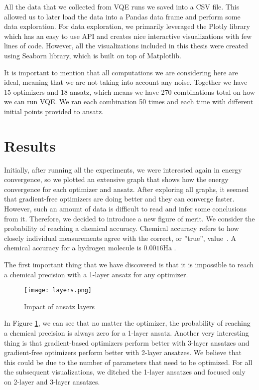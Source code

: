 All the data that we collected from VQE runs we saved into a CSV file. This allowed us to later load the data into a Pandas data frame and perform some data exploration. For data exploration, we primarily leveraged the Plotly library which has an easy to use API and creates nice interactive visualizations with few lines of code. However, all the visualizations included in this thesis were created using Seaborn library, which is built on top of Matplotlib.

It is important to mention that all computations we are considering here are ideal, meaning that we are not taking into account any noise. Together we have 15 optimizers and 18 ansatz, which means we have 270 combinations total on how we can run VQE. We ran each combination 50 times and each time with different initial points provided to ansatz. 

\section{Results} 
Initially, after running all the experiments, we were interested again in energy convergence, so we plotted an extensive graph that shows how the energy convergence for each optimizer and ansatz. After exploring all graphs, it seemed that gradient-free optimizers are doing better and they can converge faster. However, such an amount of data is difficult to read and infer some conclusions from it. Therefore, we decided to introduce a new figure of merit. We consider the probability of reaching a chemical accuracy. Chemical accuracy refers to how closely individual measurements agree with the correct, or ''true'', value~\cite{chemistry}. A chemical accuracy for a hydrogen molecule is $0.0016$Ha . 


The first important thing that we have discovered is that it is impossible to reach a chemical precision with a 1-layer ansatz for any optimizer.
\begin{figure}
    \centering
    \texttt{[image: layers.png]}
    \caption{Impact of ansatz layers}
    \label{fig:ansatz-layers}
\end{figure}

In Figure \ref{fig:ansatz-layers}, we can see that no matter the optimizer, the probability of reaching a chemical precision is always zero for a 1-layer ansatz. Another very interesting thing is that gradient-based optimizers perform better with 3-layer ansatzes and gradient-free optimizers perform better with 2-layer ansatzes. We believe that this could be due to the number of parameters that need to be optimized. For all the subsequent visualizations, we ditched the 1-layer ansatzes and focused only on 2-layer and 3-layer ansatzes.

